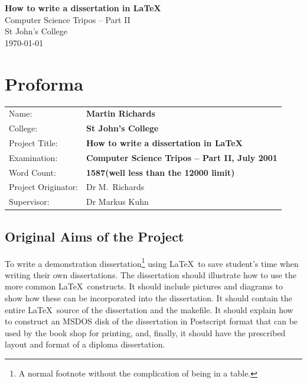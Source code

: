 \documentclass[12pt,a4paper,twoside,openright]{report}
\begin{document}

\pagestyle{empty}
\vspace*{60mm}
\begin{center}
\Huge
\textbf{How to write a dissertation in \LaTeX} \\[5mm]
Computer Science Tripos -- Part II \\[5mm]
St John's College \\[5mm]
\today %
\end{center}
\pagestyle{plain}
\chapter*{Proforma}
{\large
\begin{tabular}{ll}
Name: & \bf Martin Richards \\
College: & \bf St John's College \\
Project Title: & \bf How to write a dissertation in \LaTeX \\
Examination: & \bf Computer Science Tripos -- Part II, July 2001 \\
Word Count: & \bf 1587\footnotemark[1]
(well less than the 12000 limit) \\
Project Originator: & Dr M.~Richards \\
Supervisor: & Dr Markus Kuhn \\
\end{tabular}
}
\section*{Original Aims of the Project}
To write a demonstration dissertation\footnote{A normal footnote without the
complication of being in a table.} using \LaTeX\ to save
student's time when writing their own dissertations. The dissertation
should illustrate how to use the more common \LaTeX\ constructs. It
should include pictures and diagrams to show how these can be
incorporated into the dissertation. It should contain the entire
\LaTeX\ source of the dissertation and the makefile. It should
explain how to construct an MSDOS disk of the dissertation in
Postscript format that can be used by the book shop for printing, and,
finally, it should have the prescribed layout and format of a diploma
dissertation.
\end{document}
